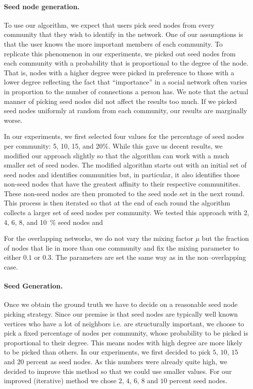 \paragraph{Seed node generation.} 
To use our algorithm, we expect that users pick seed nodes from 
every community that they wish to identify in the network. One of our assumptions is that
the user knows the more important members of each community. To replicate 
this phenomenon in our experiments, we picked out seed nodes from each community 
with a probability that is proportional to the degree of the node. That is, nodes
with a higher degree were picked in preference to those with a lower degree reflecting the 
fact that ``importance'' in a social network often varies in proportion to the number of 
connections a person has. We note that the actual manner of picking seed nodes did not 
affect the results too much. If we picked seed nodes uniformly at random from each community, 
our results are marginally worse. 

In our experiments, we first selected four values for the percentage of seed nodes 
per community: 5, 10, 15, and 20$\%$. While this gave us decent results, we modified our 
approach slightly so that the algorithm can work with a much smaller set of seed nodes. 
The modified algorithm starts out with an initial set of seed nodes and identifies 
communities but, in particular, it also identifies those non-seed nodes that have the 
greatest affinity to their respective communitites. These non-seed nodes are then promoted 
to the seed node set in the next round. This process is then iterated so that at the end of each 
round the algorithm collects a larger set of seed nodes per community. We tested this approach with 
2, 4, 6, 8, and 10~$\%$ seed nodes and 


For the overlapping networks, we do not vary the mixing factor $\mu$ but the fraction of nodes 
that lie in more than one community and fix the mixing parameter to either $0.1$ or $0.3$. 
The parameters are set the same way as in the non--overlapping case.


\paragraph{Seed Generation.}
Once we obtain the ground truth we have to decide on a reasonable seed node 
picking strategy. Since our premise is that seed nodes are typically well known vertices 
who have a lot of neighbors i.e. are structurally important, we choose to pick a fixed 
percentage of nodes per community, whose probability to be picked is proportional to their degree. 
This means nodes with high degree are more likely to be picked than others. In our experiments, 
we first decided to pick $5$, $10$, $15$ and $20$ percent as seed nodes. As this numbers were 
already quite high, we decided to improve this method so that we could use smaller values. 
For our improved (iterative) method we chose $2$, $4$, $6$, $8$ and $10$ percent seed nodes.

